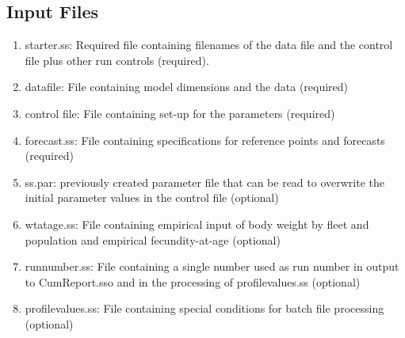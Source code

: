 	\subsection[Input Files]{Input Files \protect\hyperlink{input-files}{\faExternalLink}}
	\begin{enumerate}
		\item starter.ss: Required file containing filenames of the data file and the control file plus other run controls (required).
		\item datafile: File containing model dimensions and the data (required)
		\item control file: File containing set-up for the parameters (required)
		\item forecast.ss: File containing specifications for reference points and forecasts (required) 
		\item ss.par: previously created parameter file that can be read to overwrite the initial parameter values in the control file (optional)
		\item wtatage.ss: File containing empirical input of body weight by fleet and population and empirical fecundity-at-age (optional)
		\item runnumber.ss: File containing a single number used as run number in output to CumReport.sso and in the processing of profilevalues.ss (optional)
		\item profilevalues.ss: File containing special conditions for batch file processing (optional)
	\end{enumerate}
	
	\hypertarget{output-files}{}
